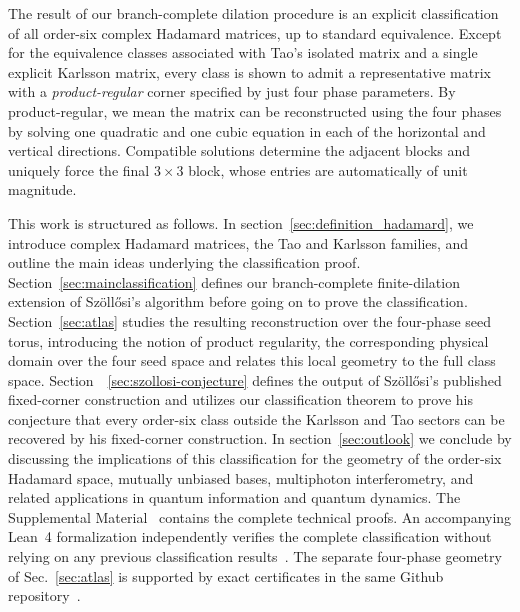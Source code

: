 The result of our branch-complete dilation procedure is an explicit classification of all order-six complex Hadamard matrices, up to standard equivalence.
Except for the equivalence classes associated with Tao's isolated matrix and a single explicit Karlsson matrix, every class is shown to admit a representative matrix with a \textit{product-regular} corner specified by just four phase parameters. 
By product-regular, we mean the matrix can be reconstructed using the four phases by solving one quadratic and one cubic equation in each of the horizontal and vertical directions. Compatible solutions determine the adjacent blocks and uniquely force the final $3\times3$ block, whose entries are automatically of unit magnitude.

This work is structured as follows. In section~\ref{sec:definition_hadamard}, we introduce complex Hadamard matrices, the Tao and Karlsson families, and outline the main ideas underlying the classification proof.
Section~\ref{sec:mainclassification} defines our branch-complete finite-dilation extension of Sz\"oll\H{o}si's algorithm before going on to prove the classification.
Section~\ref{sec:atlas} studies the resulting reconstruction over the four-phase seed torus, introducing the notion of product regularity, the corresponding physical domain over the four seed space and relates this local geometry to the full class space.
Section~~\ref{sec:szollosi-conjecture} defines the output of Sz\"oll\H{o}si's published fixed-corner construction and utilizes our classification theorem to prove his conjecture that every order-six class outside the Karlsson and Tao sectors can be recovered by his fixed-corner construction.
In section~\ref{sec:outlook} we conclude by discussing the implications of this classification for the geometry of the order-six Hadamard space, mutually unbiased bases, multiphoton interferometry, and related applications in quantum information and quantum dynamics.
The Supplemental Material~\cite{SupplementalMaterial} contains the complete technical proofs. An accompanying Lean~4 formalization independently verifies the complete classification without relying on any previous classification results~\cite{deMouraUllrich2021,CardenesWuttig2026HadamardRepository}. The separate four-phase geometry of Sec.~\ref{sec:atlas} is supported by exact certificates in the same Github repository~\cite{CardenesWuttig2026HadamardRepository}.

